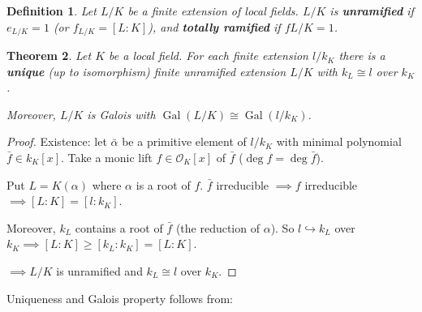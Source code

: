 \documentclass[a4paper]{article}
\newtheorem{definition}{Definition}
\newtheorem{theorem}[definition]{Theorem}
\DeclareMathOperator{\Gal}{Gal}
\begin{document}
\begin{definition}
	Let $L/K$ be a finite extension of local fields.
	$L/K$ is \textbf{unramified} if $e_{L/K} = 1$ (or $f_{L/K} = [L:K]$),
	and \textbf{totally ramified} if $f{L/K} =1$.
\end{definition}

\begin{theorem}
	Let $K$ be a local field.
	For each finite extension $l/k_K$ there is a \textbf{unique} (up to isomorphism) finite unramified extension $L/K$ with $k_L \cong l$ over $k_K$.
	
	Moreover, $L/K$ is Galois with $\Gal(L/K) \cong \Gal(l/k_K)$.
	\label{73}
\end{theorem}
\begin{proof}
	Existence: let $\bar{\alpha}$ be a primitive element of $l/k_K$ with minimal polynomial $\bar{f} \in k_K[x]$.
	Take a monic lift $f \in \mathcal{O}_K[x]$ of $\bar{f}$ ($\deg f = \deg \bar{f}$).
	
	Put $L=K(\alpha)$ where $\alpha$ is a root of $f$.
	$\bar{f}$ irreducible $\implies f$ irreducible $\implies [L:K] = [l:k_K]$.
	
	Moreover, $k_L$ contains a root of $\bar{f}$ (the reduction of $\alpha$).
	So $l \hookrightarrow k_L$ over $k_K \implies [L:K] \geq [k_L:k_K] = [L:K]$.
	
	$\implies L/K$ is unramified and $k_L \cong l$ over $k_K$.
\end{proof}

Uniqueness and Galois property follows from:
\end{document}
